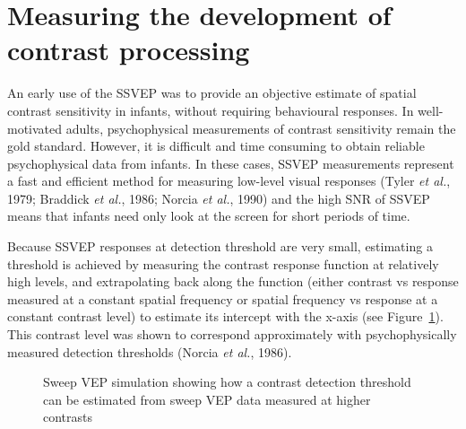 \documentclass[
  letterpaper,
  DIV=11,
  numbers=noendperiod]{scrartcl}
\begin{document}
\section{Measuring the development of contrast
processing}\label{measuring-the-development-of-contrast-processing}

An early use of the SSVEP was to provide an objective estimate of
spatial contrast sensitivity in infants, without requiring behavioural
responses. In well-motivated adults, psychophysical measurements of
contrast sensitivity remain the gold standard. However, it is difficult
and time consuming to obtain reliable psychophysical data from infants.
In these cases, SSVEP measurements represent a fast and efficient method
for measuring low-level visual responses (Tyler \emph{et al.}, 1979;
Braddick \emph{et al.}, 1986; Norcia \emph{et al.}, 1990) and the high
SNR of SSVEP means that infants need only look at the screen for short
periods of time.

Because SSVEP responses at detection threshold are very small,
estimating a threshold is achieved by measuring the contrast response
function at relatively high levels, and extrapolating back along the
function (either contrast vs response measured at a constant spatial
frequency or spatial frequency vs response at a constant contrast level)
to estimate its intercept with the x-axis (see
Figure~\ref{fig-sweepvep}). This contrast level was shown to correspond
approximately with psychophysically measured detection thresholds
(Norcia \emph{et al.}, 1986).

\begin{figure}


\caption{\label{fig-sweepvep}Sweep VEP simulation showing how a contrast
detection threshold can be estimated from sweep VEP data measured at
higher contrasts}

\end{figure}%
\end{document}

